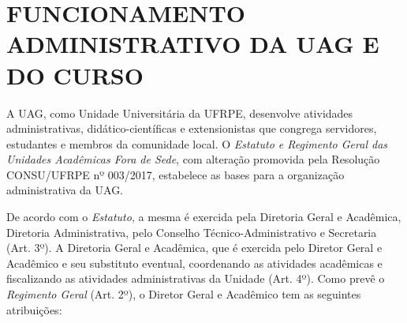 \chapter{FUNCIONAMENTO ADMINISTRATIVO DA UAG E DO CURSO}
	
A UAG, como Unidade Universitária da UFRPE, desenvolve atividades administrativas, didático-científicas e extensionistas que congrega servidores, estudantes e membros da comunidade local. O \textit{Estatuto e Regimento Geral das Unidades Acadêmicas Fora de Sede}, com alteração promovida pela Resolução CONSU/UFRPE nº 003/2017, estabelece as bases para a organização administrativa da UAG.

De acordo com o \textit{Estatuto}, a mesma é exercida pela Diretoria Geral e Acadêmica, Diretoria Administrativa, pelo Conselho Técnico-Administrativo e Secretaria (Art. 3º). A Diretoria Geral e Acadêmica, que é exercida pelo Diretor Geral e Acadêmico e seu substituto eventual, coordenando as atividades acadêmicas e fiscalizando as atividades administrativas da Unidade (Art. 4º). Como prevê o \textit{Regimento Geral} (Art. 2º), o Diretor Geral e Acadêmico tem as seguintes atribuições:

